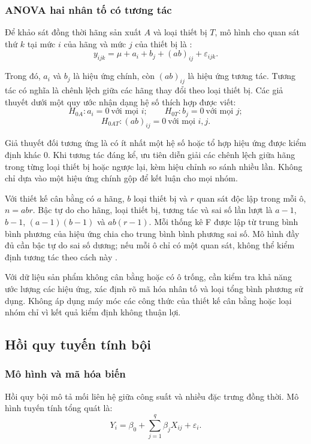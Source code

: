 \subsubsection{ANOVA hai nhân tố có tương tác}

Để khảo sát đồng thời hãng sản xuất \(A\) và loại thiết bị \(T\), mô hình cho quan sát thứ \(k\) tại mức \(i\) của hãng và mức \(j\) của thiết bị là \cite{ref12}:
\nopagebreak[4]
\[y_{ijk}=\mu+a_i+b_j+(ab)_{ij}+\varepsilon_{ijk}.\]

Trong đó, \(a_i\) và \(b_j\) là hiệu ứng chính, còn \((ab)_{ij}\) là hiệu ứng tương tác. Tương tác có nghĩa là chênh lệch giữa các hãng thay đổi theo loại thiết bị. Các giả thuyết dưới một quy ước nhận dạng hệ số thích hợp được viết:
\nopagebreak[4]
\[H_{0A}:a_i=0\ \text{với mọi }i;\qquad H_{0T}:b_j=0\ \text{với mọi }j;\]
\nopagebreak[4]
\[H_{0AT}:(ab)_{ij}=0\ \text{với mọi }i,j.\]

Giả thuyết đối tương ứng là có ít nhất một hệ số hoặc tổ hợp hiệu ứng được kiểm định khác 0. Khi tương tác đáng kể, ưu tiên diễn giải các chênh lệch giữa hãng trong từng loại thiết bị hoặc ngược lại, kèm hiệu chỉnh so sánh nhiều lần. Không chỉ dựa vào một hiệu ứng chính gộp để kết luận cho mọi nhóm.

Với thiết kế cân bằng có \(a\) hãng, \(b\) loại thiết bị và \(r\) quan sát độc lập trong mỗi ô, \(n=abr\). Bậc tự do cho hãng, loại thiết bị, tương tác và sai số lần lượt là \(a-1\), \(b-1\), \((a-1)(b-1)\) và \(ab(r-1)\). Mỗi thống kê F được lập từ trung bình bình phương của hiệu ứng chia cho trung bình bình phương sai số. Mô hình đầy đủ cần bậc tự do sai số dương; nếu mỗi ô chỉ có một quan sát, không thể kiểm định tương tác theo cách này \cite{ref12}.

Với dữ liệu sản phẩm không cân bằng hoặc có ô trống, cần kiểm tra khả năng ước lượng các hiệu ứng, xác định rõ mã hóa nhân tố và loại tổng bình phương sử dụng. Không áp dụng máy móc các công thức của thiết kế cân bằng hoặc loại nhóm chỉ vì kết quả kiểm định không thuận lợi.

\subsection{Hồi quy tuyến tính bội}

\subsubsection{Mô hình và mã hóa biến}

Hồi quy bội mô tả mối liên hệ giữa công suất và nhiều đặc trưng đồng thời. Mô hình tuyến tính tổng quát là:
\nopagebreak[4]
\[Y_i=\beta_0+\sum_{j=1}^{q}\beta_jX_{ij}+\varepsilon_i.\]

